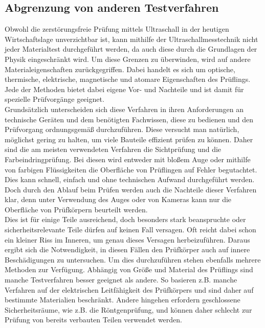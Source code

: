 \documentclass[reducespace,stylepage,semiarbeit]{spezidoc}
\begin{document}
\subsection{Abgrenzung von anderen Testverfahren}

Obwohl die zerstörungsfreie Prüfung mittels Ultraschall in der heutigen Wirtschaftslage unverzichtbar ist, kann mithilfe der Ultraschallmesstechnik nicht jeder Materialtest durchgeführt werden, da auch diese durch die Grundlagen der Physik eingeschränkt wird.
Um diese Grenzen zu überwinden, wird auf andere Materialeigenschaften zurückgegriffen.
Dabei handelt es sich um optische, thermische, elektrische, magnetische und atomare Eigenschaften des Prüflings. 
Jede der Methoden bietet dabei eigene Vor- und Nachteile und ist damit für spezielle Prüfvorgänge geeignet. \\ 
Grundsätzlich unterscheiden sich diese Verfahren in ihren Anforderungen an technische Geräten und dem benötigten Fachwissen, diese zu bedienen und den Prüfvorgang ordnungsgemäß durchzuführen. 
Diese versucht man natürlich, möglichst gering zu halten, um viele Bauteile effizient prüfen zu können.
Daher sind die am meisten verwendeten Verfahren die Sichtprüfung und die Farbeindringprüfung. 
Bei diesen wird entweder mit bloßem Auge oder mithilfe von farbigen Flüssigkeiten die Oberfläche von Prüflingen auf Fehler begutachtet. 
Dies kann schnell, einfach und ohne technischen Aufwand durchgeführt werden.
Doch durch den Ablauf beim Prüfen werden auch die Nachteile dieser Verfahren klar, denn unter Verwendung des Auges oder von Kameras kann nur die Oberfläche von Prüfkörpern beurteilt werden. \\
Dies ist für einige Teile ausreichend, doch besonders stark beanspruchte oder sicherheitsrelevante Teile dürfen auf keinen Fall versagen. 
Oft reicht dabei schon ein kleiner Riss im Inneren, um genau dieses Versagen herbeizuführen. 
Daraus ergibt sich die Notwendigkeit, in diesen Fällen den Prüfkörper auch auf innere Beschädigungen zu untersuchen.
Um dies durchzuführen stehen ebenfalls mehrere Methoden zur Verfügung.
Abhängig von Größe und Material des Prüflings sind manche Testverfahren besser geeignet als andere. 
So basieren z.B. manche Verfahren auf der elektrischen Leitfähigkeit des Prüfkörpers und sind daher auf bestimmte Materialien beschränkt.
Andere hingehen erfordern geschlossene Sicherheitsräume, wie z.B. die Röntgenprüfung, und können daher schlecht zur Prüfung von bereits verbauten Teilen verwendet werden.\\
\end{document}
